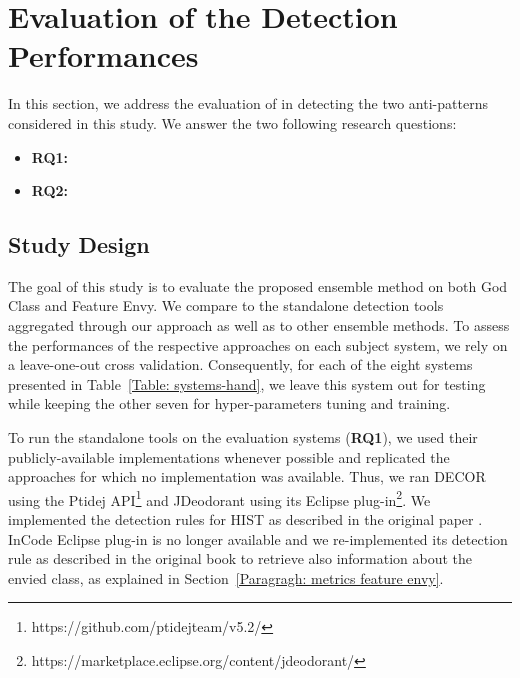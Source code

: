\section{Evaluation of the Detection Performances}
\label{section: evaluation performances}
In this section, we address the evaluation of \NAME{} in detecting the two anti-patterns considered in this study. We answer the two following research questions:

\begin{itemize}
\item \textbf{RQ1:} \textit{\RQone{}}
\item \textbf{RQ2:} \textit{\RQtwo{}}
\end{itemize}

\subsection{Study Design}
\label{subsection: study1 design}
The goal of this study is to evaluate the proposed ensemble method on both God Class and Feature Envy. We compare \NAME{} to the standalone detection tools aggregated through our approach as well as to other ensemble methods. To assess the performances of the respective approaches on each subject system, we rely on a leave-one-out cross validation. Consequently, for each of the eight systems presented in Table~\ref{Table: systems-hand}, we leave this system out for testing while keeping the other seven for hyper-parameters tuning and training. 

To run the standalone tools on the evaluation systems (\textbf{RQ1}), we used their publicly-available implementations whenever possible and replicated the approaches for which no implementation was available. Thus, we ran DECOR using the Ptidej API\footnote{https://github.com/ptidejteam/v5.2/} and JDeodorant using its Eclipse plug-in\footnote{https://marketplace.eclipse.org/content/jdeodorant/}. We implemented the detection rules for HIST as described in the original paper \cite{PalombaBPOLP13}. InCode Eclipse plug-in is no longer available and we re-implemented its detection rule as described in the original book \cite{lanza2007object} to retrieve also information about the envied class, as explained in Section~\ref{Paragragh: metrics feature envy}. 


